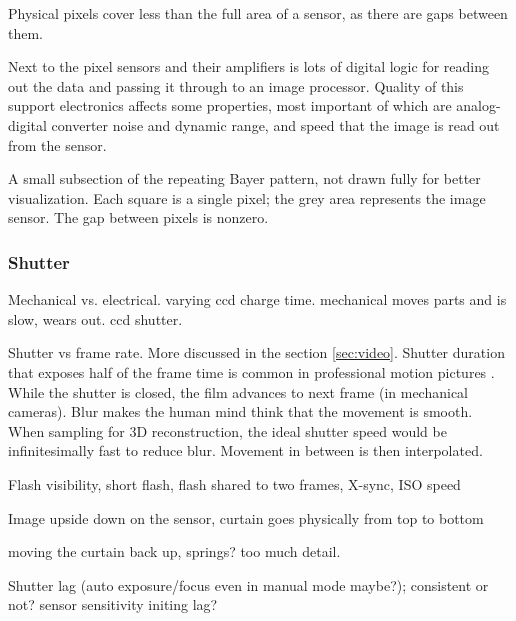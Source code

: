 
Physical pixels cover less than the full area of a sensor, as there are gaps between them.


Next to the pixel sensors and their amplifiers is lots of digital logic for reading out the data and passing it through to an image processor.
Quality of this support electronics affects some properties, most important of which are analog-digital converter noise and dynamic range, and speed that the image is read out from the sensor.


{A small subsection of the repeating Bayer pattern, not drawn fully for better visualization. Each square is a single pixel; the grey area represents the image sensor. The gap between pixels is nonzero.}



\subsubsection{Shutter} %

Mechanical vs. electrical. varying ccd charge time. mechanical moves parts and is slow, wears out. ccd shutter.

Shutter vs frame rate. More discussed in the section \ref{sec:video}. Shutter duration that exposes half of the frame time is common in professional motion pictures \cite{wilson2004anton}. While the shutter is closed, the film advances to next frame (in mechanical cameras). Blur makes the human mind think that the movement is smooth. When sampling for 3D reconstruction, the ideal shutter speed would be infinitesimally fast to reduce blur. Movement in between is then interpolated.

Flash visibility, short flash, flash shared to two frames, X-sync, ISO speed

Image upside down on the sensor, curtain goes physically from top to bottom

moving the curtain back up, springs? too much detail.

Shutter lag (auto exposure/focus even in manual mode maybe?); consistent or not? sensor sensitivity initing lag?

